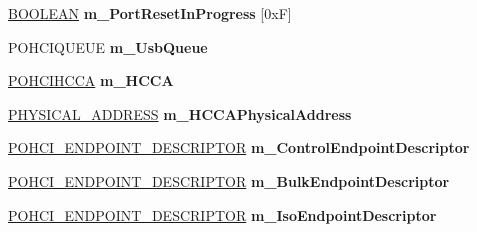 \begin{DoxyCompactItemize}
\item 
\mbox{\label{class_c_u_s_b_hardware_device_a9eaf9b06016a5b749d9c40f0a8d41132}} 
\hyperlink{_processor_bind_8h_a112e3146cb38b6ee95e64d85842e380a}{B\+O\+O\+L\+E\+AN} {\bfseries m\+\_\+\+Port\+Reset\+In\+Progress} \mbox{[}0x\+F\mbox{]}
\item 
\mbox{\label{class_c_u_s_b_hardware_device_a062b65be6fee2fcbff9027fdb31b7e6e}} 
P\+O\+H\+C\+I\+Q\+U\+E\+UE {\bfseries m\+\_\+\+Usb\+Queue}
\item 
\mbox{\label{class_c_u_s_b_hardware_device_a71e44065af4da784aa0f1d3a530af1ce}} 
\hyperlink{struct_o_h_c_i_h_c_c_a}{P\+O\+H\+C\+I\+H\+C\+CA} {\bfseries m\+\_\+\+H\+C\+CA}
\item 
\mbox{\label{class_c_u_s_b_hardware_device_ac35176977282f4e740cfc62d7319b25a}} 
\hyperlink{union___l_a_r_g_e___i_n_t_e_g_e_r}{P\+H\+Y\+S\+I\+C\+A\+L\+\_\+\+A\+D\+D\+R\+E\+SS} {\bfseries m\+\_\+\+H\+C\+C\+A\+Physical\+Address}
\item 
\mbox{\label{class_c_u_s_b_hardware_device_a73b9494eb58118a4e66c10c51822ed18}} 
\hyperlink{struct___o_h_c_i___e_n_d_p_o_i_n_t___d_e_s_c_r_i_p_t_o_r}{P\+O\+H\+C\+I\+\_\+\+E\+N\+D\+P\+O\+I\+N\+T\+\_\+\+D\+E\+S\+C\+R\+I\+P\+T\+OR} {\bfseries m\+\_\+\+Control\+Endpoint\+Descriptor}
\item 
\mbox{\label{class_c_u_s_b_hardware_device_afca646e4d29c1efabcf8b03ce7c7ce5b}} 
\hyperlink{struct___o_h_c_i___e_n_d_p_o_i_n_t___d_e_s_c_r_i_p_t_o_r}{P\+O\+H\+C\+I\+\_\+\+E\+N\+D\+P\+O\+I\+N\+T\+\_\+\+D\+E\+S\+C\+R\+I\+P\+T\+OR} {\bfseries m\+\_\+\+Bulk\+Endpoint\+Descriptor}
\item 
\mbox{\label{class_c_u_s_b_hardware_device_a8ec3a0380c263ca7392f1e53a123a39a}} 
\hyperlink{struct___o_h_c_i___e_n_d_p_o_i_n_t___d_e_s_c_r_i_p_t_o_r}{P\+O\+H\+C\+I\+\_\+\+E\+N\+D\+P\+O\+I\+N\+T\+\_\+\+D\+E\+S\+C\+R\+I\+P\+T\+OR} {\bfseries m\+\_\+\+Iso\+Endpoint\+Descriptor}
\item 
\mbox{\label{class_c_u_s_b_hardware_device_aa3078b90e63960a5f36651097cb6bdc2}} 

\end{DoxyCompactItemize}
